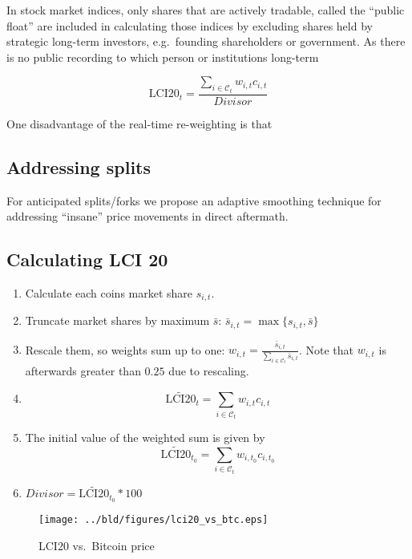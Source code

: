 \documentclass[11pt]{article}
\begin{document}
In stock market indices, only shares that are actively tradable, called the ``public float'' are included in calculating those indices by excluding shares held by strategic long-term investors, e.g.\ founding shareholders or government.
As there is no public recording to which person or institutions long-term

$$ \text{LCI20}_t = \frac{\sum_{i \in \mathcal{C}_{t}} w_{i,t} c_{i,t}}{Divisor} $$

One disadvantage of the real-time re-weighting is that

\subsection{Addressing splits}\label{subseq:split_smoothing}
For anticipated splits/forks we propose an adaptive smoothing technique for addressing ``insane'' price movements in direct aftermath.

\subsection{Calculating LCI 20}

\begin{enumerate}
  \item Calculate each coins market share $s_{i,t}$.
  \item Truncate market shares by maximum $\bar s$: $\bar s_{i,t} = \max\{ s_{i,t}, \bar s\}$
  \item Rescale them, so weights sum up to one: $w_{i,t} = \frac{\bar s_{i,t}}{\sum_{i \in \mathcal{C}_t} \bar s_{i,t}}$. Note that $w_{i,t}$ is afterwards greater than $0.25$ due to rescaling.
  \item $$\widetilde{\text{LCI20}}_t = \sum_{i \in \mathcal{C}_{t}} w_{i,t} c_{i,t}$$
  \item The initial value of the weighted sum is given by $$\widetilde{\text{LCI20}}_{t_0} = \sum_{i \in \mathcal{C}_{t}} w_{i,t_0} c_{i,t_0}$$
  \item $Divisor = \widetilde{\text{LCI20}}_{t_0} * 100$
\end{enumerate}


\begin{figure}%
    \centering%
    \texttt{[image: ../bld/figures/lci20\_vs\_btc.eps]}%
    \caption{LCI20 vs.\ Bitcoin price}\label{f:lci20vsBTC}%
\end{figure}
\end{document}
